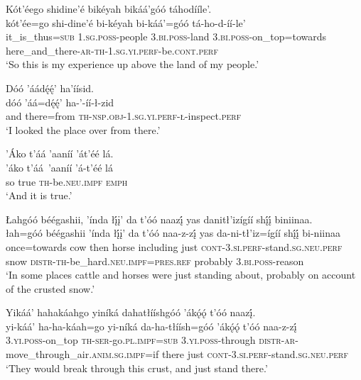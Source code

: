 \ea\label{ex:text9-13-5}
Kót’éego shidine’é bikéyah bikáá’góó táhodííle’.\\
\gll kót’ée=go	shi-dine’é	bi-kéyah	bi-káá’=góó	tá-ho-d-íí-le’\\
     it\_is\_thus=\textsc{sub}	1.\textsc{sg}.\textsc{poss}-people	3.\textsc{bi}.\textsc{poss}-land	3.\textsc{bi}.\textsc{poss}-on\_top=towards	here\_and\_there-\textsc{ar}-\textsc{th}-1.\textsc{sg}.\textsc{yi}.\textsc{perf}-be.\textsc{cont}.\textsc{perf}\\
\glt `So this is my experience up above the land of my people.'
\z

\ea\label{ex:text9-13-6}
Dóó ’áádę́ę́’ ha’íísid.\\
\gll dóó	’áá=dę́ę́’	ha-’-íí-ł-zid\\
     and	there=from	\textsc{th}-\textsc{nsp}.\textsc{obj}-1.\textsc{sg}.\textsc{yi}.\textsc{perf}-\textsc{ł}-inspect.\textsc{perf}\\
\glt `I looked the place over from there.'
\z

\ea\label{ex:text9-14-1}
’Áko t’áá ’aaníí ’át’éé lá.\\
\gll ’áko	t’áá~{’aaníí}	’á-t’éé	lá\\
     so	true	\textsc{th}-be.\textsc{neu}.\textsc{impf}	\textsc{emph}\\
\glt `And it is true.'
\z

\ea\label{ex:text9-14-2}
Łahgóó béégashii, ’índa łį́į’ da t’óó naazį́ yas danitł’izígíí shį́į́ biniinaa.\\
\gll łah=góó	béégashii	’índa	łį́į’	da	t’óó	naa-z-zį́	yas	da-ni-tł’iz=ígíí	shį́į́	bi-niinaa\\
     once=towards	cow	then	horse	including	just	\textsc{cont}-3.\textsc{si}.\textsc{perf}-stand.\textsc{sg}.\textsc{neu}.\textsc{perf}	snow	\textsc{distr}-\textsc{th}-be\_hard.\textsc{neu}.\textsc{impf}=\textsc{pres}.\textsc{ref}	probably	3.\textsc{bi}.\textsc{poss}-reason\\
\glt `In some places cattle and horses were just standing about, probably on account of the crusted snow.'
\z

\newpage
\ea\label{ex:text9-14-3}
Yikáá’ hahakáahgo yiníká dahatłííshgóó ’ákǫ́ǫ́ t’óó naazį́.\\
\gll yi-káá’	ha-ha-káah=go	yi-níká	da-ha-tłíísh=góó	’ákǫ́ǫ́	t’óó	naa-z-zį́\\
     3.\textsc{yi}.\textsc{poss}-on\_top	\textsc{th}-\textsc{ser}-go.\textsc{pl}.\textsc{impf}=\textsc{sub}	3.\textsc{yi}.\textsc{poss}-through	\textsc{distr}-\textsc{ar}-move\_through\_air.\textsc{anim}.\textsc{sg}.\textsc{impf}=if	there	just	\textsc{cont}-3.\textsc{si}.\textsc{perf}-stand.\textsc{sg}.\textsc{neu}.\textsc{perf}\\
\glt `They would break through this crust, and just stand there.'
\z

